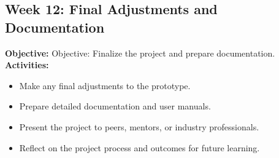 \documentclass[a4paper,12pt]{article}
\begin{document}
\subsection*{Week 12: Final Adjustments and Documentation}
\hspace*{4ex} \textbf{Objective:} Objective: Finalize the project and prepare documentation.\\
\hspace*{7.5ex} \textbf{Activities:}
\begin{itemize}
    \setlength{\itemindent}{7.5ex} %
    \item {Make any final adjustments to the prototype.}
    \item {Prepare detailed documentation and user manuals.}
    \item {Present the project to peers, mentors, or industry professionals.}
    \item {Reflect on the project process and outcomes for future learning.}
\end{itemize}
\end{document}
